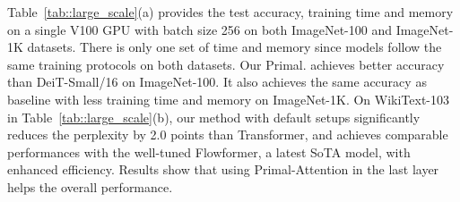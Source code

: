 \documentclass{article}
\begin{document}
{Table~\ref{tab::large_scale}(a) provides the test accuracy, training time and memory on a single V100 GPU with batch size 256 on both ImageNet-100 and ImageNet-1K datasets.
There is only one set of time and memory since models follow the same training protocols on both datasets.
Our Primal. achieves better accuracy than DeiT-Small/16 on ImageNet-100.
It also achieves the same accuracy as baseline with less training time and memory on ImageNet-1K. 
On WikiText-103 in Table~\ref{tab::large_scale}(b), our method with default setups significantly reduces the perplexity by 2.0 points than Transformer, and achieves comparable performances with the well-tuned Flowformer, a latest SoTA model, with enhanced efficiency.
Results show that using Primal-Attention in the last layer helps the overall performance.}
\end{document}
